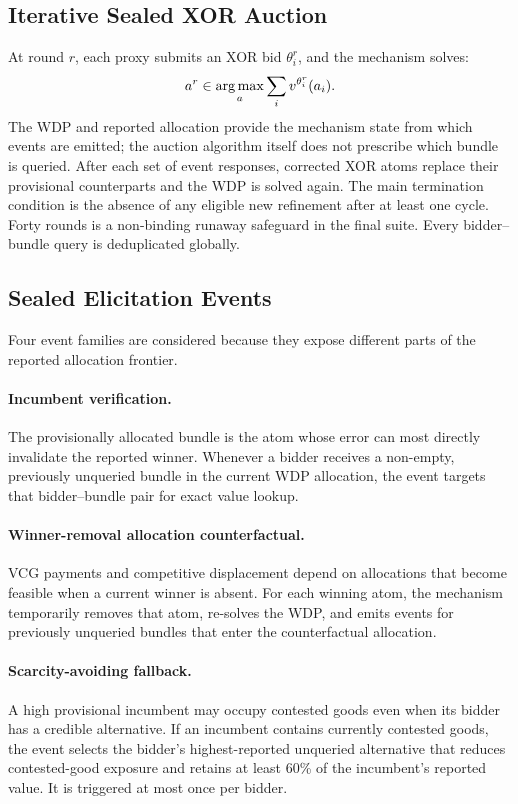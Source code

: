 \subsection{Iterative Sealed XOR Auction}

At round \(r\), each proxy submits an XOR bid \(\theta_i^r\), and the
mechanism solves:
\[
a^r\in\operatorname*{arg\,max}_a\sum_i v^{\theta_i^r}(a_i).
\]
The WDP and reported allocation provide the mechanism state from which events
are emitted; the auction algorithm itself does not prescribe which bundle is
queried. After each set of event responses, corrected XOR atoms replace their
provisional counterparts and the WDP is solved again. The main termination
condition is the absence of any eligible new refinement after at least one
cycle. Forty rounds is a non-binding runaway safeguard in the final suite.
Every bidder--bundle query is deduplicated globally.

\subsection{Sealed Elicitation Events}

Four event families are considered because they expose different parts of the
reported allocation frontier.

\paragraph{Incumbent verification.}
The provisionally allocated bundle is the atom whose error can most directly
invalidate the reported winner. Whenever a bidder receives a non-empty,
previously unqueried bundle in the current WDP allocation, the event targets
that bidder--bundle pair for exact value lookup.

\paragraph{Winner-removal allocation counterfactual.}
VCG payments and competitive displacement depend on allocations that become
feasible when a current winner is absent. For each winning atom, the mechanism
temporarily removes that atom, re-solves the WDP, and emits events for
previously unqueried bundles that enter the counterfactual allocation.

\paragraph{Scarcity-avoiding fallback.}
A high provisional incumbent may occupy contested goods even when its bidder
has a credible alternative. If an incumbent contains currently contested
goods, the event selects the bidder's highest-reported unqueried alternative
that reduces contested-good exposure and retains at least 60\% of the
incumbent's reported value. It is triggered at most once per bidder.

